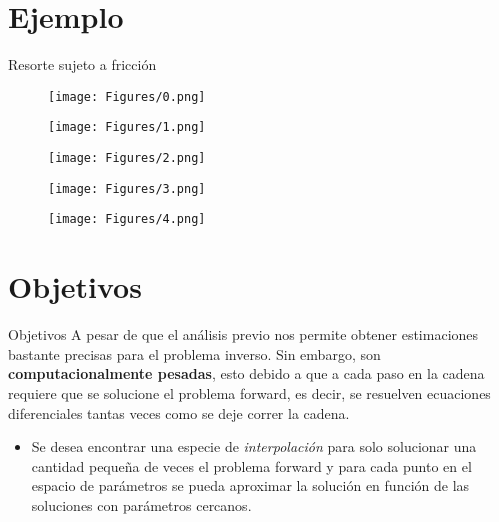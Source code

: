 \documentclass[10pt,aspectratio=169]{beamer}
\begin{document}
\section{Ejemplo}


\begin{frame}{Resorte sujeto a fricción}
  \begin{figure}
      \centering 
      \texttt{[image: Figures/0.png]} 
  \end{figure} 
\end{frame}

\begin{frame}
  \begin{figure}
      \centering 
      \texttt{[image: Figures/1.png]} 
  \end{figure} 
\end{frame}

\begin{frame}
  \begin{figure}[H] 
      \centering 
      \texttt{[image: Figures/2.png]} 
  \end{figure} 
\end{frame}

\begin{frame}
  \begin{figure}[H] 
      \centering 
      \texttt{[image: Figures/3.png]} 
  \end{figure} 
\end{frame}


\begin{frame}
  \begin{figure}[H] 
      \centering 
      \texttt{[image: Figures/4.png]} 
  \end{figure} 
\end{frame}



\section{Objetivos}


\begin{frame}{Objetivos}
  A pesar de que el análisis previo nos permite obtener estimaciones bastante precisas para el problema inverso. Sin embargo, son \textbf{computacionalmente pesadas}, esto debido a que a cada paso en la cadena requiere que se solucione el problema forward, es decir, se resuelven ecuaciones diferenciales tantas veces como se deje correr la cadena. 
  \begin{itemize}
    \item 
    Se desea encontrar una especie de \textit{interpolación} para solo solucionar una cantidad pequeña de veces el problema forward y para cada punto en el espacio de parámetros se pueda aproximar la solución en función de las soluciones con parámetros cercanos.
  \end{itemize}

\end{frame}
\end{document}

